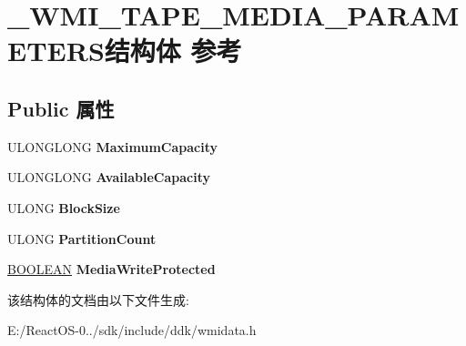 \hypertarget{struct___w_m_i___t_a_p_e___m_e_d_i_a___p_a_r_a_m_e_t_e_r_s}{}\section{\+\_\+\+W\+M\+I\+\_\+\+T\+A\+P\+E\+\_\+\+M\+E\+D\+I\+A\+\_\+\+P\+A\+R\+A\+M\+E\+T\+E\+R\+S结构体 参考}
\label{struct___w_m_i___t_a_p_e___m_e_d_i_a___p_a_r_a_m_e_t_e_r_s}
\subsection*{Public 属性}
\begin{DoxyCompactItemize}
\item 
\mbox{\label{struct___w_m_i___t_a_p_e___m_e_d_i_a___p_a_r_a_m_e_t_e_r_s_a4b6f6a25f50ea0d4206743bd18304ab7}} 
U\+L\+O\+N\+G\+L\+O\+NG {\bfseries Maximum\+Capacity}
\item 
\mbox{\label{struct___w_m_i___t_a_p_e___m_e_d_i_a___p_a_r_a_m_e_t_e_r_s_aa8650f56c0db7b8237aca9b5c1dc7fbb}} 
U\+L\+O\+N\+G\+L\+O\+NG {\bfseries Available\+Capacity}
\item 
\mbox{\label{struct___w_m_i___t_a_p_e___m_e_d_i_a___p_a_r_a_m_e_t_e_r_s_a1b1637ae27aa4cbbf3749c8ce9f87b95}} 
U\+L\+O\+NG {\bfseries Block\+Size}
\item 
\mbox{\label{struct___w_m_i___t_a_p_e___m_e_d_i_a___p_a_r_a_m_e_t_e_r_s_a751408b9e19347074fa047fa49652634}} 
U\+L\+O\+NG {\bfseries Partition\+Count}
\item 
\mbox{\label{struct___w_m_i___t_a_p_e___m_e_d_i_a___p_a_r_a_m_e_t_e_r_s_a46123447215f6b8917facd9e8b1952cd}} 
\hyperlink{_processor_bind_8h_a112e3146cb38b6ee95e64d85842e380a}{B\+O\+O\+L\+E\+AN} {\bfseries Media\+Write\+Protected}
\end{DoxyCompactItemize}


该结构体的文档由以下文件生成\+:\begin{DoxyCompactItemize}
\item 
E\+:/\+React\+O\+S-\/0../sdk/include/ddk/wmidata.\+h\end{DoxyCompactItemize}
